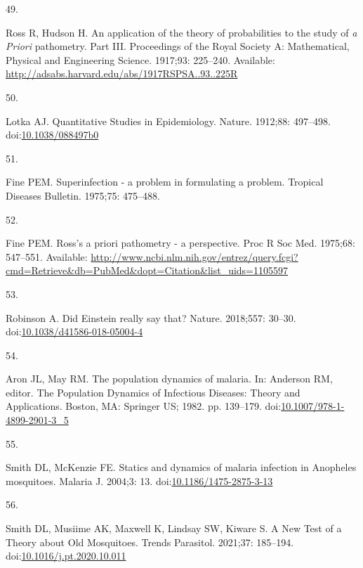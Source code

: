 \documentclass[
]{book}
\newlength{\cslhangindent}
\newlength{\csllabelwidth}
\newenvironment{CSLReferences}[2] %
 {\begin{list}{}{%
  \setlength{\itemindent}{0pt}
  \setlength{\leftmargin}{0pt}
  \setlength{\parsep}{0pt}
  \ifodd #1
   \setlength{\leftmargin}{\cslhangindent}
   \setlength{\itemindent}{-1\cslhangindent}
  \fi
  \setlength{\itemsep}{#2\baselineskip}}}
 {\end{list}}
\newcommand{\CSLLeftMargin}[1]{\parbox[t]{\csllabelwidth}{\strut#1\strut}}
\newcommand{\CSLRightInline}[1]{\parbox[t]{\linewidth - \csllabelwidth}{\strut#1\strut}}
\begin{document}
\begin{CSLReferences}{0}{1}
\CSLLeftMargin{49. }%
\CSLRightInline{Ross R, Hudson H. An application of the theory of probabilities to the study of {\emph{a Priori}} pathometry. {Part III}. Proceedings of the Royal Society A: Mathematical, Physical and Engineering Science. 1917;93: 225--240. Available: \url{http://adsabs.harvard.edu/abs/1917RSPSA..93..225R}}

\CSLLeftMargin{50. }%
\CSLRightInline{Lotka AJ. Quantitative {Studies} in {Epidemiology}. Nature. 1912;88: 497--498. doi:\href{https://doi.org/10.1038/088497b0}{10.1038/088497b0}}

\CSLLeftMargin{51. }%
\CSLRightInline{Fine PEM. Superinfection - a problem in formulating a problem. Tropical Diseases Bulletin. 1975;75: 475--488. }

\CSLLeftMargin{52. }%
\CSLRightInline{Fine PEM. Ross's a priori pathometry - a perspective. Proc R Soc Med. 1975;68: 547--551. Available: \url{http://www.ncbi.nlm.nih.gov/entrez/query.fcgi?cmd=Retrieve&db=PubMed&dopt=Citation&list_uids=1105597}}

\CSLLeftMargin{53. }%
\CSLRightInline{Robinson A. Did {Einstein} really say that? Nature. 2018;557: 30--30. doi:\href{https://doi.org/10.1038/d41586-018-05004-4}{10.1038/d41586-018-05004-4}}

\CSLLeftMargin{54. }%
\CSLRightInline{Aron JL, May RM. The population dynamics of malaria. In: Anderson RM, editor. The {Population Dynamics} of {Infectious Diseases}: {Theory} and {Applications}. {Boston, MA}: {Springer US}; 1982. pp. 139--179. doi:\href{https://doi.org/10.1007/978-1-4899-2901-3_5}{10.1007/978-1-4899-2901-3\_5}}

\CSLLeftMargin{55. }%
\CSLRightInline{Smith DL, McKenzie FE. Statics and dynamics of malaria infection in {Anopheles} mosquitoes. Malaria J. 2004;3: 13. doi:\href{https://doi.org/10.1186/1475-2875-3-13}{10.1186/1475-2875-3-13}}

\CSLLeftMargin{56. }%
\CSLRightInline{Smith DL, Musiime AK, Maxwell K, Lindsay SW, Kiware S. A {New Test} of a {Theory} about {Old Mosquitoes}. Trends Parasitol. 2021;37: 185--194. doi:\href{https://doi.org/10.1016/j.pt.2020.10.011}{10.1016/j.pt.2020.10.011}}


\end{CSLReferences}
\end{document}
